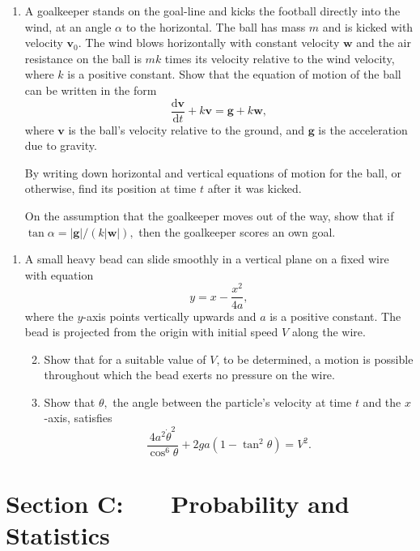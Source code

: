 \documentclass[a4, 11pt]{report}
\newlength{\qspace}
\newcounter{qnumber}
\newenvironment{question}%
 {\vspace{\qspace}
  \begin{enumerate}[\bfseries 1\quad][10]%
    \setcounter{enumi}{\value{qnumber}}%
    \item%
 }
{
  \end{enumerate}
  \filbreak
  \stepcounter{qnumber}
 }
\newenvironment{questionparts}[1][1]%
 {
  \begin{enumerate}[\bfseries (i)]%
    \setcounter{enumii}{#1}
    \addtocounter{enumii}{-1}
    \setlength{\itemsep}{5mm}
    \setlength{\parskip}{8pt}
 }
 {
  \end{enumerate}
 }
\begin{document}

\begin{question}
A goalkeeper stands on the goal-line and kicks the football directly
into the wind, at an angle $\alpha$ to the horizontal. The ball has
mass $m$ and is kicked with velocity $\mathbf{v}_{0}.$ The wind
blows horizontally with constant velocity $\mathbf{w}$ and the air
resistance on the ball is $mk$ times its velocity relative to the
wind velocity, where $k$ is a positive constant. Show that the equation
of motion of the ball can be written in the form 
\[
\frac{\mathrm{d}\mathbf{v}}{\mathrm{d}t}+k\mathbf{v}=\mathbf{g}+k\mathbf{w},
\]
where $\mathbf{v}$ is the ball's velocity relative to the ground,
and $\mathbf{g}$ is the acceleration due to gravity. 


By writing down horizontal and vertical equations of motion for the
ball, or otherwise, find its position at time $t$ after it was kicked. 


On the assumption that the goalkeeper moves out of the way, show that
if $\tan\alpha=\left|\mathbf{g}\right|/(k\left|\mathbf{w}\right|),$
then the goalkeeper scores an own goal. 
\end{question}
	
\begin{question}
A small heavy bead can slide smoothly in a vertical plane on a fixed
wire with equation 
\[
y=x-\frac{x^{2}}{4a},
\]
where the $y$-axis points vertically upwards and $a$ is a positive
constant. The bead is projected from the origin with initial speed
$V$ along the wire. 

\begin{questionparts}
\item Show that for a suitable value of $V$, to be determined, a motion
is possible throughout which the bead exerts no pressure on the wire. 
\item Show that $\theta,$ the angle between the particle's velocity at
time $t$ and the $x$-axis, satisfies 
\[
\frac{4a^{2}\dot{\theta}^{2}}{\cos^{6}\theta}+2ga(1-\tan^{2}\theta)=V^{2}.
\]

\end{questionparts}
\end{question}
	
	\newpage
\section*{Section C: \ \ \ Probability and Statistics}
\end{document}
